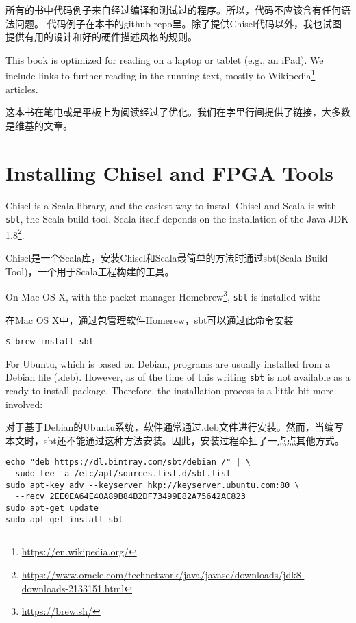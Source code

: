 \documentclass[%
    10pt,
    headinclude, footexclude,
    openright, %
    notitlepage,
    cleardoubleempty,
    headsepline,
    pointlessnumbers,
    bibtotoc, idxtotoc,
    ]{scrbook}
\newcommand{\code}[1]{{\small{\texttt{#1}}}}
\newcommand{\myref}[2]{\href{#1}{#2}}
\renewcommand{\myref}[2]{{#2}{\footnote{\url{#1}}}}
\begin{document}
所有的书中代码例子来自经过编译和测试过的程序。所以，代码不应该含有任何语法问题。
代码例子在本书的github repo里。除了提供Chisel代码以外，我也试图提供有用的设计和好的硬件描述风格的规则。


This book is optimized for reading on a laptop or tablet (e.g., an iPad).
We include links to further reading in the running text, mostly to
\myref{https://en.wikipedia.org/}{Wikipedia} articles.

这本书在笔电或是平板上为阅读经过了优化。我们在字里行间提供了链接，大多数是维基的文章。

\section{Installing Chisel and FPGA Tools}

Chisel is a Scala library, and the easiest way to install Chisel and Scala is
with \code{sbt}, the Scala build tool. Scala itself depends on the installation
of the \myref{https://www.oracle.com/technetwork/java/javase/downloads/jdk8-downloads-2133151.html}{Java JDK 1.8}.

Chisel是一个Scala库，安装Chisel和Scala最简单的方法时通过sbt(Scala Build Tool)，一个用于Scala工程构建的工具。

On Mac OS X, with the packet manager \myref{https://brew.sh/}{Homebrew},
\code{sbt} is installed with:

在Mac OS X中，通过包管理软件Homerew，sbt可以通过此命令安装

\begin{verbatim}
$ brew install sbt
\end{verbatim}

\noindent For Ubuntu, which is based on Debian, programs are usually installed from a
Debian file (.deb). However, as of the time of this writing \code{sbt} is not
available as a ready to install package. Therefore, the installation process
is a little bit more involved:

对于基于Debian的Ubuntu系统，软件通常通过.deb文件进行安装。然而，当编写本文时，sbt还不能通过这种方法安装。因此，安装过程牵扯了一点点其他方式。

\begin{verbatim}
echo "deb https://dl.bintray.com/sbt/debian /" | \
  sudo tee -a /etc/apt/sources.list.d/sbt.list
sudo apt-key adv --keyserver hkp://keyserver.ubuntu.com:80 \
  --recv 2EE0EA64E40A89B84B2DF73499E82A75642AC823
sudo apt-get update
sudo apt-get install sbt
\end{verbatim}
\end{document}
